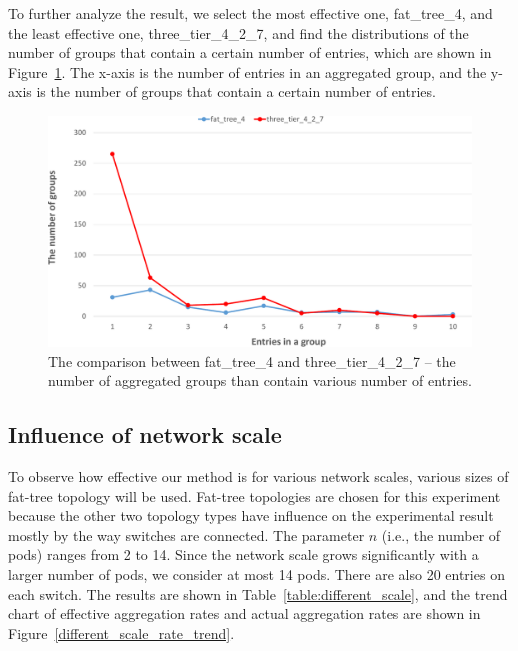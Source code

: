 \documentclass[conference]{IEEEtran}
\begin{document}
To further analyze the result, we select the most effective one, fat\_tree\_4, and the least effective one, three\_tier\_4\_2\_7, and find the distributions of the number of groups that contain a certain number of entries, which are shown in Figure~\ref{different_topo_distribute}. The x-axis is the number of entries in an aggregated group, and the y-axis is the number of groups that contain a certain number of entries.

\begin{figure}[ht]
\centering 
\includegraphics[width=1\linewidth]{figures/exp_topotype_distribute.pdf}
\caption{The comparison between fat\_tree\_4 and three\_tier\_4\_2\_7 -- the number of aggregated groups than contain various number of entries.}
\label{different_topo_distribute}
\end{figure}

\subsection{Influence of network scale}
To observe how effective our method is for various network scales, various sizes of fat-tree topology will be used. Fat-tree topologies are chosen for this experiment because the other two topology types have influence on the experimental result mostly by the way switches are connected. The parameter $n$ (i.e., the number of pods) ranges from 2 to 14. Since the network scale grows significantly with a larger number of pods, we consider at most 14 pods. There are also 20 entries on each switch. The results are shown in Table~\ref{table:different_scale}, and the trend chart of effective aggregation rates and actual aggregation rates are shown in Figure~\ref{different_scale_rate_trend}.
\end{document}
